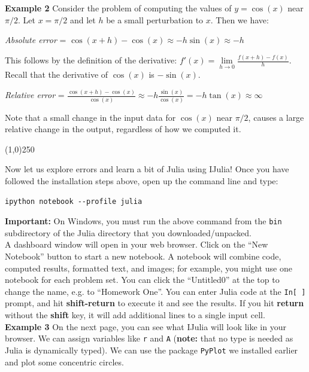 \documentclass[11pt,a4paper,oneside]{report}
\begin{document}
{\bf Example 2 } Consider the problem of computing the values of $y = \cos(x)$ near $\pi/2$. Let $x = \pi/2$ and let $h$ be a small perturbation to $x$. Then we have:
\begin{center}
\emph{Absolute error} = $\cos(x+h) - \cos(x) \approx -h\sin(x) \approx -h$
\end{center}
This follows by the definition of the derivative: $\displaystyle f'(x) = \lim\limits_{h \rightarrow 0} \frac{f(x+h) - f(x)}{h}$. Recall that the derivative of $\cos(x)$ is $-\sin(x)$.
\begin{center}
\emph{Relative error} = $\displaystyle\frac{\cos(x+h) - \cos(x)}{\cos(x)} \approx -h\frac{\sin(x)}{\cos(x)} = -h\tan(x) \approx \infty$
\end{center}
Note that a small change in the input data for $\cos(x)$ near $\pi/2$, causes a large relative change in the output, regardless of how we computed it.

\begin{center}
\line(1,0){250}
\end{center}

Now let us explore errors and learn a bit of Julia using IJulia! Once you have followed the installation steps above, open up the command line and type:
\begin{verbatim}
ipython notebook --profile julia
\end{verbatim}

{\bf Important: }On Windows, you must run the above command from the \verb+bin+ subdirectory of the Julia directory that you downloaded/unpacked.\\

A dashboard window will open in your web browser. Click on the ``New Notebook'' button to start a new notebook. A notebook will combine code, computed results, formatted text, and images; for example, you might use one notebook for each problem set. You can click the ``Untitled0'' at the top to change the name, e.g. to ``Homework One''. You can enter Julia code at the \verb+In[ ]+ prompt, and hit {\bf shift-return} to execute it and see the results. If you hit {\bf return} without the {\bf shift} key, it will add additional lines to a single input cell. \\

{\bf Example 3 } On the next page, you can see what IJulia will look like in your browser. We can assign variables like \verb+r+ and \verb+A+ ({\bf note:} that no type is needed as Julia is dynamically typed). We can use the package \verb+PyPlot+ we installed earlier and plot some concentric circles.\\
\end{document}
